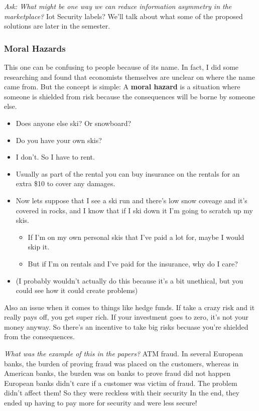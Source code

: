 \documentclass[11pt]{article}
\begin{document}
{\it Ask: What might be one way we can reduce information asymmetry in the marketplace?} Iot Security labels? We'll talk about what some of the proposed solutions are later in the semester.

\subsubsection{Moral Hazards}

This one can be confusing to people because of its name. In fact, I did some researching and found that economists themselves are unclear on where the name came from. But the concept is simple: A {\bf moral hazard} is a situation where someone is shielded from risk because the consequences will be borne by someone else.
\begin{itemize}
    \item Does anyone else ski? Or snowboard? 
    \item Do you have your own skis?
    \item I don't. So I have to rent. 
    \item Usually as part of the rental you can buy insurance on the rentals for an extra \$10 to cover any damages. 
    \item Now lets suppose that I see a ski run and there's low snow coveage and it's covered in rocks, and I know that if I ski down it I'm going to scratch up my skis. 
    \begin{itemize}
        \item If I'm on my own personal skis that I've paid a lot for, maybe I would skip it. 
        \item But if I'm on rentals and I've paid for the insurance, why do I care?
    \end{itemize}
    \item (I probably wouldn't actually do this because it's a bit unethical, but you could see how it could create problems)
\end{itemize}

Also an issue when it comes to things like hedge funds. If take a crazy risk and it really pays off, you get super rich. If your investment goes to zero, it's not your money anyway. So there's an incentive to take big risks becuase you're shielded from the consequences.

{\it What was the example of this in the papers?} ATM fraud. In several European banks, the burden of proving fraud was placed on the customers, whereas in American banks, the burden was on banks to prove fraud did not happen European banks didn't care if a customer was victim of fraud. The problem didn't affect them! So they were reckless with their security
In the end, they ended up having to pay more for security and were less secure!
\end{document}
